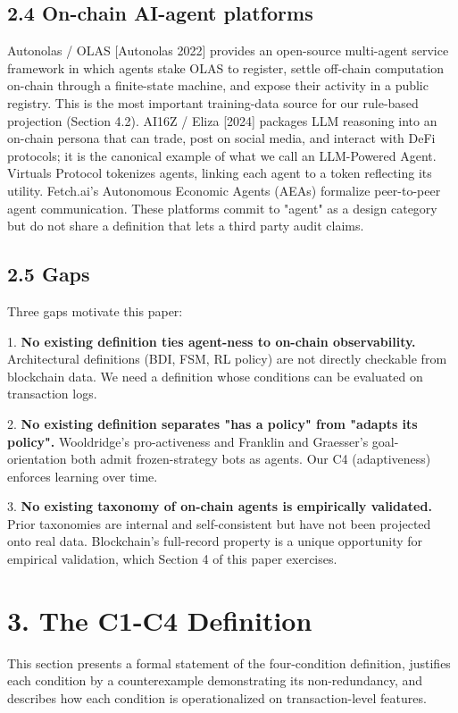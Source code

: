 \documentclass[sigconf,nonacm=false]{acmart}
\begin{document}
\subsection{2.4 On-chain AI-agent platforms}

Autonolas / OLAS [Autonolas 2022] provides an open-source multi-agent service framework in which agents stake OLAS to register, settle off-chain computation on-chain through a finite-state machine, and expose their activity in a public registry. This is the most important training-data source for our rule-based projection (Section 4.2). AI16Z / Eliza [2024] packages LLM reasoning into an on-chain persona that can trade, post on social media, and interact with DeFi protocols; it is the canonical example of what we call an LLM-Powered Agent. Virtuals Protocol tokenizes agents, linking each agent to a token reflecting its utility. Fetch.ai's Autonomous Economic Agents (AEAs) formalize peer-to-peer agent communication. These platforms commit to "agent" as a design category but do not share a definition that lets a third party audit claims.

\subsection{2.5 Gaps}

Three gaps motivate this paper:

1. \textbf{No existing definition ties agent-ness to on-chain observability.} Architectural definitions (BDI, FSM, RL policy) are not directly checkable from blockchain data. We need a definition whose conditions can be evaluated on transaction logs.

2. \textbf{No existing definition separates "has a policy" from "adapts its policy".} Wooldridge's pro-activeness and Franklin and Graesser's goal-orientation both admit frozen-strategy bots as agents. Our C4 (adaptiveness) enforces learning over time.

3. \textbf{No existing taxonomy of on-chain agents is empirically validated.} Prior taxonomies are internal and self-consistent but have not been projected onto real data. Blockchain's full-record property is a unique opportunity for empirical validation, which Section 4 of this paper exercises.


\section{3. The C1-C4 Definition}

This section presents a formal statement of the four-condition definition, justifies each condition by a counterexample demonstrating its non-redundancy, and describes how each condition is operationalized on transaction-level features.
\end{document}
